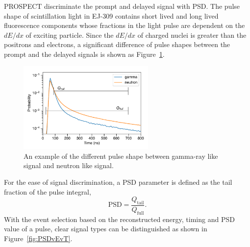 	PROSPECT discriminate the prompt and delayed signal with PSD. 
	The pulse shape of scintillation light in EJ-309 contains short lived and long lived fluorescence components whose fractions in the light pulse are dependent on the $dE/dx$ of exciting particle. 
	Since the $dE/dx$ of charged nuclei is greater than the positrons and electrons, a significant difference of pulse shapes between the prompt and the delayed signals is shown as Figure~\ref{fig:PSD}.
	\begin{figure}[h]
    \centering
    \includegraphics[width=0.6\textwidth]{Figures/PSD.pdf}
    \caption[Pulse shape difference]{
	An example of the different pulse shape between gamma-ray like signal and neutron like signal.
	}
    \label{fig:PSD}
	\end{figure}
	For the ease of signal discrimination, a PSD parameter is defined as the tail fraction of the pulse integral, 
	\begin{equation}
       	\textrm{PSD} = \frac{Q_\textrm{tail}}{Q_\textrm{full}}.
    \end{equation}
    With the event selection based on the reconstructed energy, timing and PSD value of a pulse, clear signal types can be distinguished as shown in Figure~\ref{fig:PSDvEvT}.
